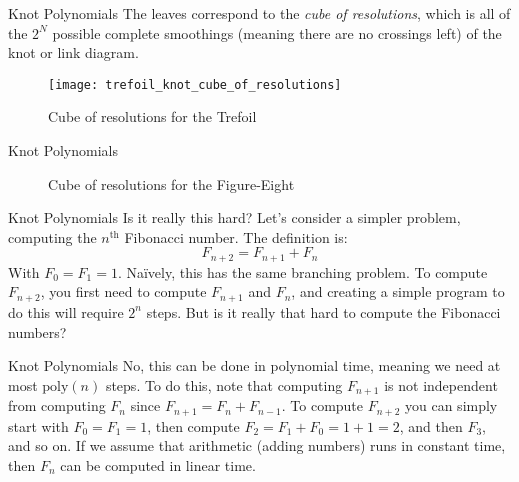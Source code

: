 \documentclass{beamer}
\begin{document}
    \begin{frame}{Knot Polynomials}
        The leaves correspond to the \textit{cube of resolutions}, which is
        all of the $2^{N}$ possible complete smoothings (meaning there are
        no crossings left) of the knot or link diagram.
        \begin{figure}
            \centering
            \texttt{[image: trefoil\_knot\_cube\_of\_resolutions]}
            \caption{Cube of resolutions for the Trefoil}
        \end{figure}
    \end{frame}
    \begin{frame}{Knot Polynomials}
        \begin{figure}
            \centering
            \caption{Cube of resolutions for the Figure-Eight}
        \end{figure}
    \end{frame}
    \begin{frame}{Knot Polynomials}
        Is it really this hard? Let's consider a simpler problem, computing
        the $n^{\textrm{th}}$ Fibonacci number. The definition is:
        \begin{equation}
            F_{n+2}=F_{n+1}+F_{n}
        \end{equation}
        With $F_{0}=F_{1}=1$. Na\"{i}vely, this has the same branching problem.
        To compute $F_{n+2}$, you first need to compute $F_{n+1}$ and $F_{n}$,
        and creating a simple program to do this will require $2^{n}$ steps.
        But is it really that hard to compute the Fibonacci numbers?
    \end{frame}
    \begin{frame}{Knot Polynomials}
        No, this can be done in polynomial time, meaning we need at most
        $\textrm{poly}(n)$ steps. To do this, note that computing $F_{n+1}$
        is not independent from computing $F_{n}$ since
        $F_{n+1}=F_{n}+F_{n-1}$. To compute $F_{n+2}$ you can simply start with
        $F_{0}=F_{1}=1$, then compute $F_{2}=F_{1}+F_{0}=1+1=2$, and then
        $F_{3}$, and so on. If we assume that arithmetic (adding numbers)
        runs in constant time, then $F_{n}$ can be computed in linear time.
    \end{frame}
\end{document}
